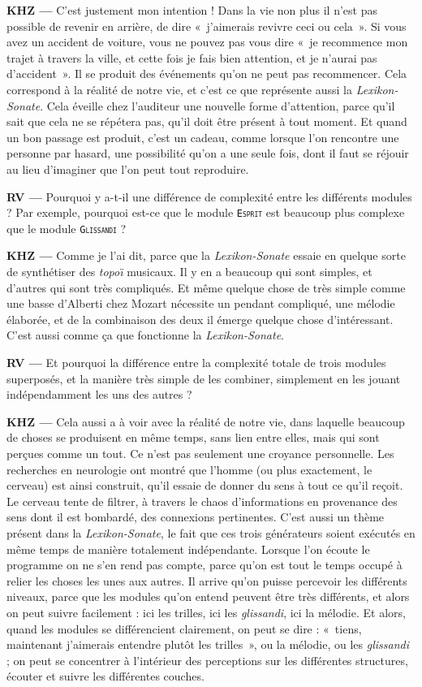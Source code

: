\documentclass[a4paper,12pt]{article}
\newcommand{\guill}[1]{«~#1~»}
\newcommand{\module}[1]{\texttt{\textsc{#1}}}
\begin{document}
\textbf{KHZ ---} C'est justement mon intention ! Dans la vie non plus il n'est pas possible de revenir en arrière, de dire \guill{j'aimerais revivre ceci ou cela}. Si vous avez un accident de voiture, vous ne pouvez pas vous dire \guill{je recommence mon trajet à travers la ville, et cette fois je fais bien attention, et je n'aurai pas d'accident}. Il se produit des événements qu'on ne peut pas recommencer. Cela correspond à la réalité de notre vie, et c'est ce que représente aussi la \emph{Lexikon-Sonate}. Cela éveille chez l'auditeur une nouvelle forme d'attention, parce qu'il sait que cela ne se répétera pas, qu'il doit être présent à tout moment. Et quand un bon passage est produit, c'est un cadeau, comme lorsque l'on rencontre une personne par hasard, une possibilité qu'on a une seule fois, dont il faut se réjouir au lieu d'imaginer que l'on peut tout reproduire.

\textbf{RV ---} Pourquoi y a-t-il une différence de complexité entre les différents modules ? Par exemple, pourquoi est-ce que le module \module{Esprit} est beaucoup plus complexe que le module \module{Glissandi} ?

\textbf{KHZ ---} Comme je l'ai dit, parce que la \emph{Lexikon-Sonate} essaie en quelque sorte de synthétiser des \emph{topo\"\i} musicaux. Il y en a beaucoup qui sont simples, et d'autres qui sont très compliqués. Et même quelque chose de très simple comme une basse d'Alberti chez Mozart nécessite un pendant compliqué, une mélodie élaborée, et de la combinaison des deux il émerge quelque chose d'intéressant. C'est aussi comme ça que fonctionne la \emph{Lexikon-Sonate}.

\textbf{RV ---} Et pourquoi la différence entre la complexité totale de trois modules superposés, et la manière très simple de les combiner, simplement en les jouant indépendamment les uns des autres ?

\textbf{KHZ ---} Cela aussi a à voir avec la réalité de notre vie, dans laquelle beaucoup de choses se produisent en même temps, sans lien entre elles, mais qui sont perçues comme un tout. Ce n'est pas seulement une croyance personnelle. Les recherches en neurologie ont montré que l'homme (ou plus exactement, le cerveau) est ainsi construit, qu'il essaie de donner du sens à tout ce qu'il reçoit. Le cerveau tente de filtrer, à travers le chaos d'informations en provenance des sens dont il est bombardé, des connexions pertinentes. C'est aussi un thème présent dans la \emph{Lexikon-Sonate}, le fait que ces trois générateurs soient exécutés en même temps de manière totalement indépendante. Lorsque l'on écoute le programme on ne s'en rend pas compte, parce qu'on est tout le temps occupé à relier les choses les unes aux autres. Il arrive qu'on puisse percevoir les différents niveaux, parce que les modules qu'on entend peuvent être très différents, et alors on peut suivre facilement : ici les trilles, ici les \emph{glissandi}, ici la mélodie. Et alors, quand les modules se différencient clairement, on peut se dire : \guill{tiens, maintenant j'aimerais entendre plutôt les trilles}, ou la mélodie, ou les \emph{glissandi} ; on peut se concentrer à l'intérieur des perceptions sur les différentes structures, écouter et suivre les différentes couches.
\end{document}
